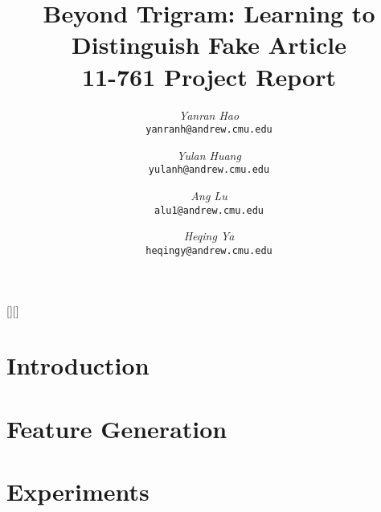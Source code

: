 \documentclass[12pt,twocolumn]{article}
\begin{document}
[][\FBwidth]
\newcommand{\beq}{\begin{equation}}
\newcommand{\eeq}{\end{equation}}
\newcommand{\bit}{\begin{itemize*}}
\newcommand{\eit}{\end{itemize*}}
\newcommand{\goal}[1]{ {\noindent {$\Rightarrow$} \em {#1} } }
\newcommand{\hide}[1]{}
\newcommand{\comment}[1]{ {\footnotesize {#1} } }
\newtheorem{lemma}{Lemma}
\newtheorem{theorem}{Theorem}
\newtheorem{proof}{Proof}
\newtheorem{defn}{Definition}
\newtheorem{algo}{Algorithm}
\newtheorem{observation}{Observation}

\title{Beyond Trigram: Learning to Distinguish Fake Article\\11-761 Project Report}


\author{ 
	{\em Yanran Hao} \\
	    {\tt yanranh@andrew.cmu.edu}
	 \and
	 {\em Yulan Huang} \\
	    {\tt yulanh@andrew.cmu.edu}
	  \and  
	{\em Ang Lu} \\
	    {\tt alu1@andrew.cmu.edu}
	 \and
	 {\em Heqing Ya} \\
	     {\tt heqingy@andrew.cmu.edu}
        }


\maketitle
%    

\section{Introduction}
    \label{sec:intro}
    

\section{Feature Generation}
    \label{sec:feature}
    
    
%   


\section{Experiments}
    \label{sec:experiments}
    
\end{document}
